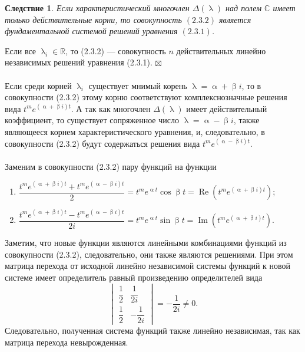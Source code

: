 \documentclass[a4paper, 12pt]{report}
\newenvironment{Proof} %
{\par\noindent{$\blacklozenge$}} %
{\hfill$\scriptstyle\boxtimes$}
\newcommand{\Rm}{\mathbb{R}}
\newcommand{\Cm}{\mathbb{C}}
\renewcommand{\alpha}{\upalpha}
\renewcommand{\beta}{\upbeta}
\renewcommand{\lambda}{\uplambda}
\renewcommand{\Re}{\operatorname{Re}}
\renewcommand{\Im}{\operatorname{Im}}
\begin{document}
	\newtheorem*{2_3_2}{Следствие}\begin{2_3_2}
		Если характеристический многочлен $\Delta(\lambda)$ над полем $\Cm$ имеет только действительные корни, то совокупность $(2.3.2)$ является фундаментальной системой решений уравнения $(2.3.1)$.
	\end{2_3_2}\begin{Proof}
		Если все $\lambda_i\in\Rm$, то (2.3.2) --- совокупность $n$ действительных линейно независимых решений уравнения (2.3.1).
	\end{Proof}\\\\
	Если среди корней $\lambda_i$ существует мнимый корень $\lambda = \alpha + \beta i$, то в совокупности (2.3.2) этому корню соответствуют комплекснозначные решения вида $t^me^{(\alpha + \beta i)t}$. А так как многочлен $\Delta(\lambda)$ имеет действительный коэффициент, то существует сопряженное число $\lambda = \alpha - \beta i$, также являющееся корнем характеристического уравнения, и, следовательно, в совокупности (2.3.2) будут содержаться решения вида $t^me^{(\alpha - \beta i)t}$.\\\\
	Заменим в совокупности (2.3.2) пару функций на функции\begin{enumerate}
		\item $\dfrac{t^me^{(\alpha + \beta i)t} + t^me^{(\alpha - \beta i)t}}{2} = t^me^{\alpha t}\cos\beta t = \Re(t^me^{(\alpha + \beta i)t})$;
		\item $\dfrac{t^me^{(\alpha + \beta i)t} - t^me^{(\alpha - \beta i)t}}{2i} = t^me^{\alpha t}\sin\beta t = \Im(t^me^{(\alpha + \beta i)t})$.
	\end{enumerate}
	Заметим, что новые функции являются линейными комбинациями функций из совокупности (2.3.2), следовательно, они также являются решениями. При этом матрица перехода от исходной линейно независимой системы функций к новой системе имеет определитель равный произведению определителей вида $$\begin{vmatrix}
		\dfrac{1}{2} & \dfrac{1}{2i}\\[2ex]
		\dfrac{1}{2} & -\dfrac{1}{2i}
	\end{vmatrix} = -\dfrac{1}{2i}\ne 0.$$ Следовательно, полученная система функций также линейно независимая, так как матрица перехода невырожденная.
\end{document}
